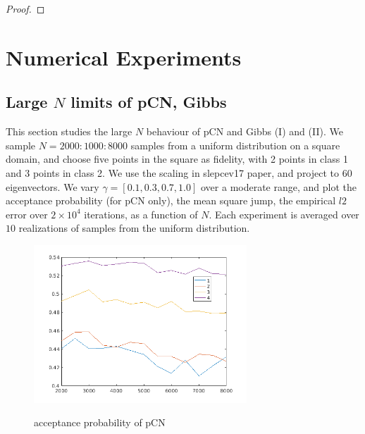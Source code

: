\documentclass[final]{siamart0516}
\newcommand{\bbP}{\mathbb{P}}
\begin{document}
\begin{proof}

\end{proof}







\section{Numerical Experiments}
\subsection{Large $N$ limits of pCN, Gibbs}
This section studies the large $N$ behaviour of pCN and Gibbs (I) and (II). We sample $N = 2000:1000:8000$ samples from a uniform distribution on a square domain, and choose five points in the square as fidelity, with 2 points in class 1 and 3 points in class 2. We use the scaling in slepcev17 paper, and project to $60$ eigenvectors. We vary $\gamma = [0.1, 0.3, 0.7, 1.0]$ over a moderate range, and plot the acceptance probability (for pCN only), the mean square jump, the empirical $l2$ error over $2 \times 10^4$ iterations, as a function of $N$. Each experiment is averaged over $10$ realizations of samples from the uniform distribution.


\begin{figure}[!ht]
\centering
{\includegraphics[width=80mm]{Figures/Convergence_accprob_pCN.png}}
\caption{acceptance probability of pCN}\label{fig:pcn-acc}
\end{figure}
 
\end{document}
